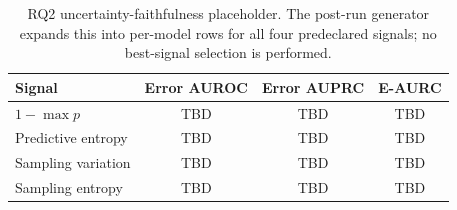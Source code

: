 \begin{table}[t]
\centering
\small
\begin{tabular}{@{}lccc@{}}
\toprule
Signal & Error AUROC & Error AUPRC & E-AURC \\
\midrule
$1-\max p$ & TBD & TBD & TBD \\
Predictive entropy & TBD & TBD & TBD \\
Sampling variation & TBD & TBD & TBD \\
Sampling entropy & TBD & TBD & TBD \\
\bottomrule
\end{tabular}
\caption{RQ2 uncertainty-faithfulness placeholder. The post-run generator expands this into per-model rows for all four predeclared signals; no best-signal selection is performed.}
\label{tab:rq2}
\end{table}
